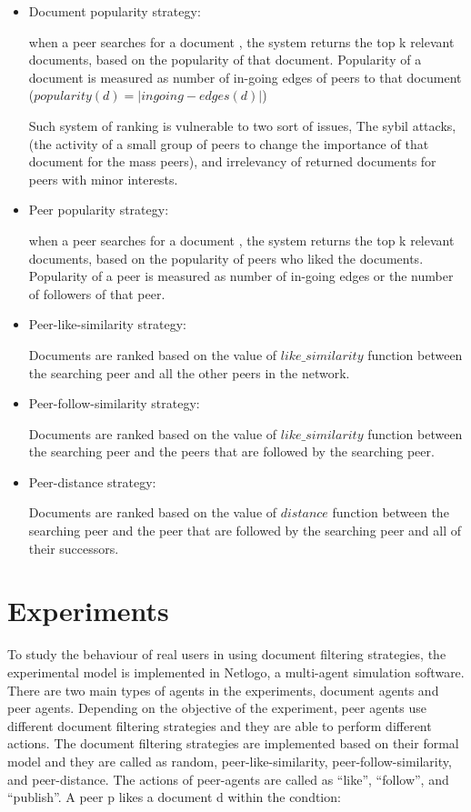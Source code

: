 \documentclass [12pt]{article} \usepackage{multicol}
\begin{document}
\begin{itemize}

 \item Document popularity strategy:

	 when a peer searches for a document , the system returns the top k relevant documents,
     based on the popularity of that document. Popularity of a document is measured as 
     number of in-going edges of peers to that document ($ popularity(d)= | {ingoing-edges}(d)| $)
    
	     Such system of ranking is vulnerable to two sort of issues,
     The sybil attacks, (the activity of a small group of peers to
     change the importance of that document for the mass peers), and
     irrelevancy of returned documents for peers with minor interests.
     
     
\item Peer popularity strategy:

	 when a peer searches for a document , the system returns the top k relevant documents,
     based on the popularity of peers who liked the documents. Popularity of a peer is measured as 
     number of in-going edges or the number of followers of that peer.
    
\item Peer-like-similarity strategy:

Documents are ranked based on the value of $ {like\_similarity}$ function between the searching peer  and all the other peers in the network.

\item Peer-follow-similarity strategy:

Documents are ranked based on the value of $ like\_similarity$ function between the searching peer and the peers that are followed by the searching peer.

\item Peer-distance strategy:

Documents are ranked based on the value of $distance$ function between the searching peer and the peer that are followed by the searching peer and all of 
their successors. 

\end{itemize}



\section{Experiments} To study the behaviour of real users in
	using document filtering strategies, the experimental model is
	implemented in Netlogo, a multi-agent simulation software. There
	are two main types of agents in the experiments, document agents
	and peer agents. Depending on the objective of the experiment,
	peer agents use different document filtering strategies and they
	are able to perform different actions. The document filtering
	strategies are implemented based on their formal model and they
	are called as  random, peer-like-similarity,
	peer-follow-similarity, and peer-distance. The actions of
	peer-agents are called as ``like'', ``follow'', and ``publish''.
	A peer p likes a document d within the condtion: 
	
\end{document}
